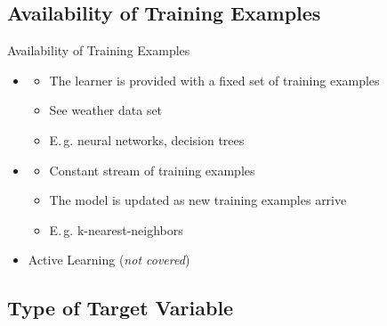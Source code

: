 \subsection{Availability of Training Examples}

\begin{frame}{Availability of Training Examples}{}
	\begin{itemize}
		\item {}
		\begin{itemize}
			\item The learner is provided with a fixed set of training examples
			\item See weather data set
			\item E.\,g. neural networks, decision trees
		\end{itemize}
		\item {}
		\begin{itemize}
			\item Constant stream of training examples
			\item The model is updated as new training examples arrive
			\item E.\,g. k-nearest-neighbors
		\end{itemize}
		\item Active Learning (\textit{not covered})
	\end{itemize}
\end{frame}


\subsection{Type of Target Variable}

